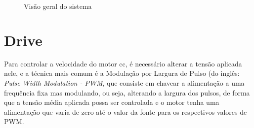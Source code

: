 \begin{figure}[!htb]
\center


\caption{Visão geral do sistema }
\end{figure}





\section{Drive}

Para controlar a velocidade do motor cc, é necessário alterar a tensão aplicada nele, e a técnica mais comum é a Modulação por Largura de Pulso (do inglês: \emph{Pulse Width Modulation - PWM}, que consiste em chavear a alimentação a uma frequência fixa mas modulando, ou seja, alterando a largura dos pulsos, de forma que a tensão média aplicada possa ser controlada e o motor tenha uma alimentação que varia de zero até o valor da fonte para os respectivos valores de PWM.

